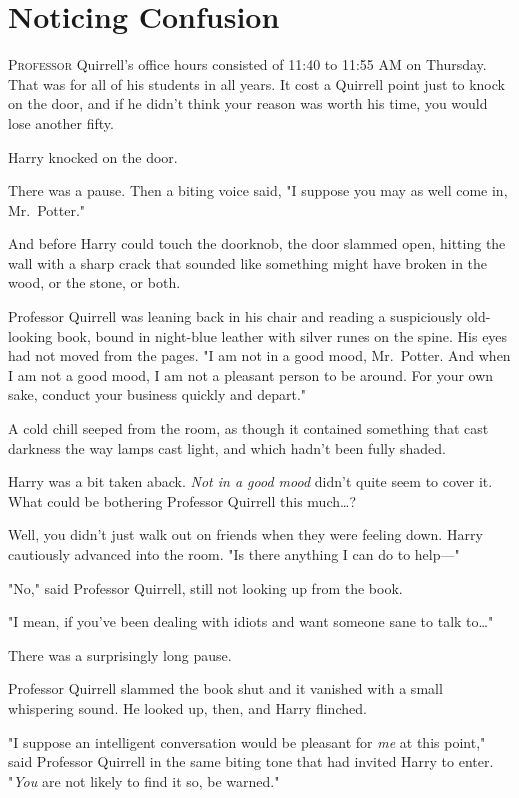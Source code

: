 \chapter{Noticing Confusion}

\lettrine{P}{rofessor} Quirrell's office hours consisted of 11:40 to 11:55 AM on Thursday. 
That was for all of his students in all years. It cost a Quirrell point just to 
knock on the door, and if he didn't think your reason was worth his time, you 
would lose another fifty.

Harry knocked on the door.

There was a pause. Then a biting voice said, "I suppose you may as well come 
in, Mr.~Potter."

And before Harry could touch the doorknob, the door slammed open, hitting the 
wall with a sharp crack that sounded like something might have broken in the 
wood, or the stone, or both.

Professor Quirrell was leaning back in his chair and reading a suspiciously 
old-looking book, bound in night-blue leather with silver runes on the spine. 
His eyes had not moved from the pages. "I am not in a good mood, Mr.~Potter. 
And when I am not a good mood, I am not a pleasant person to be around. For 
your own sake, conduct your business quickly and depart."

A cold chill seeped from the room, as though it contained something that cast 
darkness the way lamps cast light, and which hadn't been fully shaded.

Harry was a bit taken aback. \emph{Not in a good mood} didn't quite seem to 
cover it. What could be bothering Professor Quirrell this much{\ldots}?

Well, you didn't just walk out on friends when they were feeling down. Harry 
cautiously advanced into the room. "Is there anything I can do to help---"

"No," said Professor Quirrell, still not looking up from the book.

"I mean, if you've been dealing with idiots and want someone sane to talk 
to{\ldots}"

There was a surprisingly long pause.

Professor Quirrell slammed the book shut and it vanished with a small 
whispering sound. He looked up, then, and Harry flinched.

"I suppose an intelligent conversation would be pleasant for \emph{me} at this 
point," said Professor Quirrell in the same biting tone that had invited Harry 
to enter. "\emph{You} are not likely to find it so, be warned."

